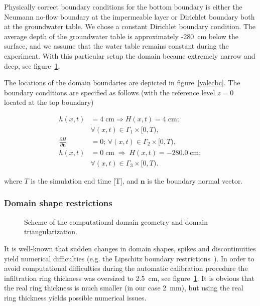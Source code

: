\documentclass[review,times,3p,10pt]{elsarticle}
\newenvironment{lineq}
    {\begin{linenomath*}
    \begin{equation}
    }
    { 
    \end{equation} 
    \end{linenomath*}
    }
\renewcommand{\vec}{\mathbf}
\begin{document}
Physically correct boundary conditions for the bottom boundary is either the Neumann no-flow boundary at the impermeable layer or Dirichlet boundary both at the groundwater table. We chose a constant Dirichlet boundary condition. The average depth of the groundwater table is approximately -280~cm below the surface, and  we assume that the water table remains constant during the experiment. With this particular setup the domain became extremely narrow and deep, see figure~\ref{valec}.





The locations of the domain boundaries are depicted in figure~\ref{valecbc}. The boundary conditions are specified as follows (with the reference level $z=0$ located at the top boundary)
\begin{lineq} 
\label{bccond}
\begin{split}
h(x,t) &= 4 \; \mbox{cm} \Rightarrow H(x,t) = 4 \; \mbox{cm}; \\ &\forall (x,t) \in \Gamma_1 \times [0,T), \\
\frac{\partial H}{\partial \vec{n}} &= 0; \, \forall (x,t) \in \Gamma_2 \times [0,T), \\
h(x,t) &= 0  \; \mbox{cm}  \; \Rightarrow \; H(x,t) = -280.0  \; \mbox{cm}; \\ &\forall (x,t) \in \Gamma_3 \times [0,T).
\end{split}
\end{lineq}
where $T$ is the simulation end time [T], and $\vec{n}$ is the boundary normal vector.

\subsubsection{Domain shape restrictions}

 \begin{figure}
\centering
{}
 \caption{Scheme of the computational domain geometry and domain triangularization.}
 \label{valec}
\end{figure}


It is well-known that sudden changes in domain shapes, spikes and discontinuities yield numerical difficulties (e.g. the Lipschitz boundary restrictions~\citep{braess}).
In order to avoid computational difficulties during the automatic calibration procedure the infiltration ring thickness was oversized  to 2.5~cm, see figure~\ref{valec}. It is obvious that the real ring thickness is much smaller (in our case 2~mm), but using the real ring thickness yields possible numerical issues. 
\end{document}
